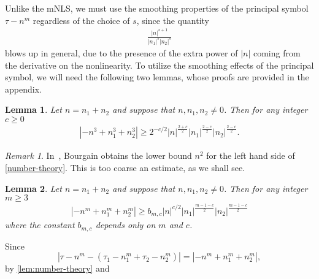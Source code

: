 \documentclass[12pt,reqno]{amsart}
\numberwithin{equation}{section}  %
\numberwithin{figure}{section}
\theoremstyle{plain}
\newtheorem{lemma}{Lemma}
\theoremstyle{definition}
\theoremstyle{remark}
\newtheorem{remark}{Remark}
\begin{document}
%
%
Unlike the mNLS, we must use the smoothing properties of the
principal symbol $\tau - n^m$ regardless of the choice of $s$, since the quantity
%
%
\begin{equation}
	\label{convo-multiplier}
	\begin{split}
		\frac{|n|^{s+1}}{|n_1|^s |n_2|^s }
	\end{split}
\end{equation}
%
%
blows up in general, due to the presence of the extra power of $|n|$ coming from the derivative on
the nonlinearity. To utilize the smoothing effects of the principal symbol, we
will need the following two lemmas, whose
proofs are provided in the appendix.
%
%
%
\begin{lemma}
	\label{lem:number-theory1}
	Let $n=n_1 + n_2$ and suppose that $n, n_1, n_2\neq
	0$. Then for any integer $c \ge 0$
%
%
\begin{equation}
	\begin{split}
		\label{number-theory1}
		| - n^{3} + n_1^3 + n_2^3| \ge 2^{-c/2} | n |^{\frac{2+c}{2}} | n_{1}
		|^{\frac{2-c}{2}}| n_2 |^{\frac{2-c}{2}}.
	\end{split}
\end{equation}
%
%
\end{lemma}
%
%
\begin{remark}
	In~\cite{Bourgain-Fourier-transfo}, Bourgain obtains the lower bound $n^2$ for
	the left hand side of \eqref{number-theory}. This is too coarse an estimate,
	as we shall see.
\end{remark}
%
%
%
%
\begin{lemma}
	\label{lem:number-theory}
	Let $n=n_1 + n_2$ and suppose that $n, n_1, n_2\neq
	0$. Then for any integer  $m \ge 3$
%
%
\begin{equation}
	\begin{split}
		\label{number-theory}
		| - n^{m} + n_1^{m} + n_2^{m }| \ge b_{m, c } 
		|n|^{c/2} |n_1|^{\frac{m-1-c}{2}} | n_2 |^{\frac{m-1-c}{2}}
		\end{split}
\end{equation}
%
%
where the constant $b_{m,c}$ depends only on $m$ and $c$. 
\end{lemma}
%
%
%
%
%
%
Since $$| \tau - n^{m} - \left( \tau_1 - n_1^{m} 
+ \tau_2 - n_2^{m }  \right ) | = | - n^{m} + n_1^{m} +
n_2^{m }|,$$ by \autoref{lem:number-theory} and
\end{document}
